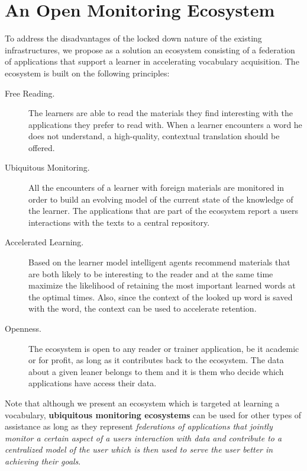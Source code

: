 

\section {An Open Monitoring Ecosystem}

To address the disadvantages of the locked down nature of the existing infrastructures, we propose as a solution an ecosystem consisting of a federation of applications that support a learner in accelerating vocabulary acquisition. The ecosystem is built on the following principles:

\begin{description}

	\item [Free Reading.] The learners are able to read the materials they find interesting with the applications they prefer to read with. When a learner encounters a word he does not understand, a high-quality, contextual translation should be offered.

	\item [Ubiquitous Monitoring.] All the encounters of a learner with foreign materials are monitored in order to build an evolving model of the current state of the knowledge of the learner. The applications that are part of the ecosystem report a users interactions with the texts to a central repository.

	\item [Accelerated Learning.] Based on the learner model intelligent agents recommend materials that are both likely to be interesting to the reader and at the same time maximize the likelihood of retaining the most important learned words at the optimal times. Also, since the context of the looked up word is saved with the word, the context can be used to accelerate retention.

	\item [Openness.] The ecosystem is open to any reader or trainer application, be it academic or for profit, as long as it contributes back to the ecosystem. The data about a given leaner belongs to them and it is them who decide which applications have access their data.

\end{description}

Note that although we present an ecosystem which is targeted at learning a vocabulary, {\bf ubiquitous monitoring ecosystems} can be used for other types of assistance as long as they represent {\em federations of applications that jointly monitor a certain aspect of a users interaction with data and contribute to a centralized model of the user which is then used to serve the user better in achieving their goals}.

